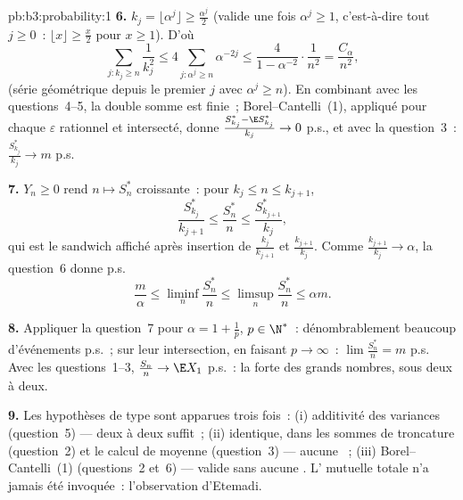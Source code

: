 \begin{solution}{pb:b3:probability:1}
\textbf{6.} $k_j = \lfloor\alpha^j\rfloor \geq
\frac{\alpha^j}2$ (valide une fois $\alpha^j \geq 1$,
c'est-à-dire tout $j \geq 0$~: $\lfloor x\rfloor \geq
\frac x2$ pour $x \geq 1$). D'où
\[
\sum_{j : k_j \geq n}\frac1{k_j^2}
\leq 4\sum_{j : \alpha^j \geq n}\alpha^{-2j}
\leq \frac{4}{1 - \alpha^{-2}}\cdot\frac1{n^2}
= \frac{C_\alpha}{n^2},
\]
(série géométrique depuis le premier $j$ avec $\alpha^j
\geq n$). En combinant avec les questions~4--5, la double
somme est finie~; Borel--Cantelli~(1), appliqué pour chaque
$\varepsilon$ rationnel et intersecté, donne
$\frac{S^*_{k_j} - \E S^*_{k_j}}{k_j} \to 0$ p.s., et avec
la question~3~: $\frac{S^*_{k_j}}{k_j} \to m$ p.s.

\textbf{7.} $Y_n \geq 0$ rend $n \mapsto S^*_n$ croissante~:
pour $k_j \leq n \leq k_{j+1}$,
\[
\frac{S^*_{k_j}}{k_{j+1}} \leq \frac{S^*_n}{n} \leq
\frac{S^*_{k_{j+1}}}{k_j},
\]
qui est le sandwich affiché après insertion de
$\frac{k_j}{k_{j+1}}$ et $\frac{k_{j+1}}{k_j}$. Comme
$\frac{k_{j+1}}{k_j} \to \alpha$, la question~6 donne p.s.
\[
\frac m\alpha \leq \liminf_n\frac{S^*_n}n \leq
\limsup_n\frac{S^*_n}n \leq \alpha m .
\]

\textbf{8.} Appliquer la question~7 pour $\alpha = 1 +
\frac1p$, $p \in \N^*$~: dénombrablement beaucoup
d'événements p.s.~; sur leur intersection, en faisant $p
\to \infty$~: $\lim\frac{S^*_n}n = m$ p.s. Avec les
questions~1--3, $\frac{S_n}n \to \E X_1$ p.s.~: la 
forte des grands nombres, sous  deux à deux.

\textbf{9.} Les hypothèses de type  sont
apparues trois fois~: (i) additivité des variances
(question~5) --- deux à deux suffit~; (ii) 
identique, dans les sommes de troncature (question~2) et
le calcul de moyenne (question~3) --- aucune ~;
(iii) Borel--Cantelli~(1) (questions~2 et~6) --- valide
sans aucune . L' mutuelle totale
n'a jamais été invoquée~: l'observation d'Etemadi.


\end{solution}
